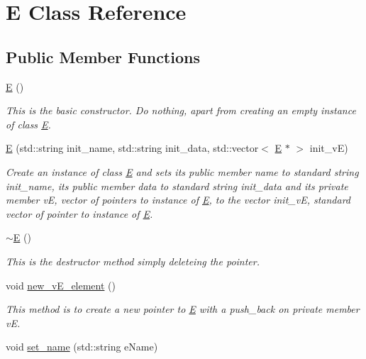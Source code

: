 \hypertarget{classE}{}\section{E Class Reference}
\label{classE}
\subsection*{Public Member Functions}
\begin{DoxyCompactItemize}
\item 
\hyperlink{classE_ac26294d340a47c6a51c615c177052c91}{E} ()
\begin{DoxyCompactList}\small\item\em This is the basic constructor. Do nothing, apart from creating an empty instance of class \hyperlink{classE}{E}. \end{DoxyCompactList}\item 
\hyperlink{classE_aaef580a7f041f660ec68449300d516c8}{E} (std\+::string init\+\_\+name, std\+::string init\+\_\+data, std\+::vector$<$ \hyperlink{classE}{E} $\ast$ $>$ init\+\_\+vE)
\begin{DoxyCompactList}\small\item\em Create an instance of class \hyperlink{classE}{E} and sets its public member \textquotesingle{}name\textquotesingle{} to standard string init\+\_\+name, its public member \textquotesingle{}data\textquotesingle{} to standard string init\+\_\+data and its private member vE, vector of pointers to instance of \hyperlink{classE}{E}, to the vector init\+\_\+vE, standard vector of pointer to instance of \hyperlink{classE}{E}. \end{DoxyCompactList}\item 
\hyperlink{classE_a7edcff371a18184dcc16cdf1523a001a}{$\sim$E} ()
\begin{DoxyCompactList}\small\item\em This is the destructor method simply deleteing the pointer. \end{DoxyCompactList}\item 
void \hyperlink{classE_a5fef91a84daddb1e9a1cfd2de704c229}{new\+\_\+v\+E\+\_\+element} ()
\begin{DoxyCompactList}\small\item\em This method is to create a new pointer to \hyperlink{classE}{E} with a push\+\_\+back on private member vE. \end{DoxyCompactList}\item 
void \hyperlink{classE_a2536bf5e123b74905fac652168eacecc}{set\+\_\+name} (std\+::string e\+Name)

\end{DoxyCompactItemize}
